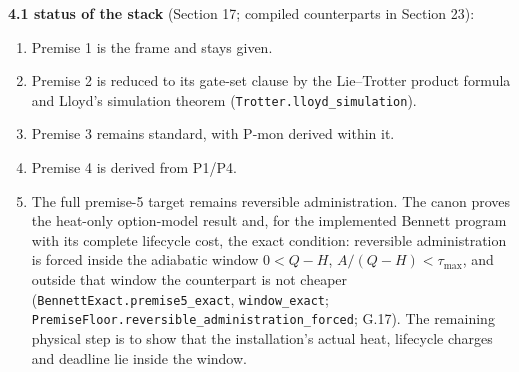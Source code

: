 \documentclass[
]{article}
\providecommand{\tightlist}{%
  \setlength{\itemsep}{0pt}\setlength{\parskip}{0pt}}
\begin{document}
\textbf{4.1 status of the stack} (Section 17; compiled counterparts in
Section 23):

\begin{enumerate}
\def\labelenumi{\arabic{enumi}.}
\tightlist
\item
  Premise 1 is the frame and stays given.
\item
  Premise 2 is reduced to its gate-set clause by the Lie--Trotter
  product formula and Lloyd's simulation theorem
  (\texttt{T\allowbreak{}r\allowbreak{}o\allowbreak{}t\allowbreak{}t\allowbreak{}e\allowbreak{}r\allowbreak{}.\allowbreak{}l\allowbreak{}l\allowbreak{}o\allowbreak{}y\allowbreak{}d\allowbreak{}\_\allowbreak{}s\allowbreak{}i\allowbreak{}m\allowbreak{}u\allowbreak{}l\allowbreak{}a\allowbreak{}t\allowbreak{}i\allowbreak{}o\allowbreak{}n}).
\item
  Premise 3 remains standard, with P-mon derived within it.
\item
  Premise 4 is derived from P1/P4.
\item
  The full premise-5 target remains reversible administration. The canon
  proves the heat-only option-model result and, for the implemented
  Bennett program with its complete lifecycle cost, the exact condition:
  reversible administration is forced inside the adiabatic window
  \(0<Q-H\), \(A/(Q-H)<\tau_{\max}\), and outside that window the
  counterpart is not cheaper
  (\texttt{B\allowbreak{}e\allowbreak{}n\allowbreak{}n\allowbreak{}e\allowbreak{}t\allowbreak{}t\allowbreak{}E\allowbreak{}x\allowbreak{}a\allowbreak{}c\allowbreak{}t\allowbreak{}.\allowbreak{}p\allowbreak{}r\allowbreak{}e\allowbreak{}m\allowbreak{}i\allowbreak{}s\allowbreak{}e\allowbreak{}5\allowbreak{}\_\allowbreak{}e\allowbreak{}x\allowbreak{}a\allowbreak{}c\allowbreak{}t},
  \texttt{window\_exact};
  \texttt{P\allowbreak{}r\allowbreak{}e\allowbreak{}m\allowbreak{}i\allowbreak{}s\allowbreak{}e\allowbreak{}F\allowbreak{}l\allowbreak{}o\allowbreak{}o\allowbreak{}r\allowbreak{}.\allowbreak{}r\allowbreak{}e\allowbreak{}v\allowbreak{}e\allowbreak{}r\allowbreak{}s\allowbreak{}i\allowbreak{}b\allowbreak{}l\allowbreak{}e\allowbreak{}\_\allowbreak{}a\allowbreak{}d\allowbreak{}m\allowbreak{}i\allowbreak{}n\allowbreak{}i\allowbreak{}s\allowbreak{}t\allowbreak{}r\allowbreak{}a\allowbreak{}t\allowbreak{}i\allowbreak{}o\allowbreak{}n\allowbreak{}\_\allowbreak{}f\allowbreak{}o\allowbreak{}r\allowbreak{}c\allowbreak{}e\allowbreak{}d};
  G.17). The remaining physical step is to show that the installation's
  actual heat, lifecycle charges and deadline lie inside the window.

\end{enumerate}
\end{document}
